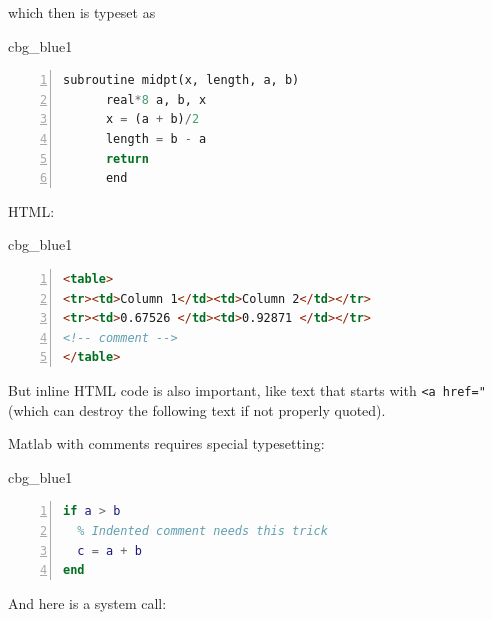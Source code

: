 \n\documentclass[%
oneside,                 %
final,                   %
10pt]{article}
\newenvironment{_cod_tight}[1]{
   \def\FrameCommand{\colorbox{#1}}
   \FrameRule0.6pt\MakeFramed {\FrameRestore}\vskip3mm}
   {\vskip0mm\endMakeFramed}
\newenvironment{cod}[1]{
\bgroup\rmfamily
\fboxsep=0mm\relax
\begin{_cod_tight}{#1}
\list{}{\parsep=-2mm\parskip=0mm\topsep=0pt\leftmargin=2mm
\rightmargin=2\leftmargin\leftmargin=4pt\relax}
\item\relax}
{\endlist\end{_cod_tight}\egroup}
\theoremstyle{definition}
\begin{document}
which then is typeset as








\begin{cod}{cbg_blue1}\begin{lstlisting}[language=Python,style=myspeciallststyle,numbers=left,numberstyle=\tiny,stepnumber=3,numbersep=15pt,xleftmargin=1mm]
      subroutine midpt(x, length, a, b)
      real*8 a, b, x
      x = (a + b)/2
      length = b - a
      return
      end

\end{lstlisting}\end{cod}
\noindent


HTML:







\begin{cod}{cbg_blue1}\begin{lstlisting}[language=html,style=myspeciallststyle,numbers=left,numberstyle=\tiny,stepnumber=3,numbersep=15pt,xleftmargin=1mm]
<table>
<tr><td>Column 1</td><td>Column 2</td></tr>
<tr><td>0.67526 </td><td>0.92871 </td></tr>
<!-- comment -->
</table>

\end{lstlisting}\end{cod}
\noindent


But inline HTML code is also important, like text that starts with
\texttt{<a href="} (which can destroy the following text if not properly
quoted).

Matlab with comments requires special typesetting:







\begin{cod}{cbg_blue1}\begin{lstlisting}[language=matlab,style=myspeciallststyle,numbers=left,numberstyle=\tiny,stepnumber=3,numbersep=15pt,xleftmargin=1mm]
% Comment on the beginning of the line can be escaped by %%
if a > b
  % Indented comment needs this trick
  c = a + b
end

\end{lstlisting}\end{cod}
\noindent


And here is a system call:
\end{document}

